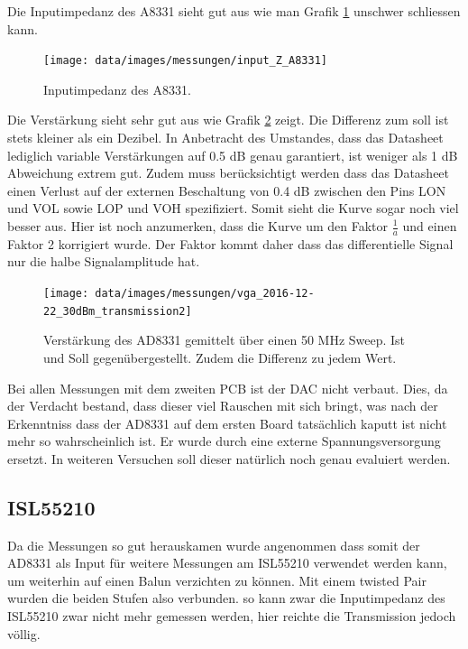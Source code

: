 Die Inputimpedanz des A8331 sieht gut aus wie man Grafik \ref{fig:Z_in_A8331} unschwer schliessen kann.

\begin{figure}[H]
\begin{center}
    \texttt{[image: data/images/messungen/input\_Z\_A8331]}
    \caption{Inputimpedanz des A8331.}
    \label{fig:Z_in_A8331}
\end{center}
\end{figure}

Die Verstärkung sieht sehr gut aus wie Grafik \ref{fig:T_A8331} zeigt. Die Differenz zum soll ist stets kleiner als ein Dezibel. In Anbetracht des Umstandes, dass das Datasheet lediglich variable Verstärkungen auf 0.5 dB genau garantiert, ist weniger als 1 dB Abweichung extrem gut. Zudem muss berücksichtigt werden dass das Datasheet einen Verlust auf der externen Beschaltung von 0.4 dB zwischen den Pins LON und VOL sowie LOP und VOH spezifiziert.
Somit sieht die Kurve sogar noch viel besser aus.
Hier ist noch anzumerken, dass die Kurve um den Faktor $\frac{1}{a}$ und einen Faktor 2 korrigiert wurde. Der Faktor kommt daher dass das differentielle Signal nur die halbe Signalamplitude hat. 

\begin{figure}[H]
\begin{center}
    \texttt{[image: data/images/messungen/vga\_2016-12-22\_30dBm\_transmission2]}
    \caption{Verstärkung des AD8331 gemittelt über einen 50 MHz Sweep. Ist und Soll gegenübergestellt. Zudem die Differenz zu jedem Wert.}
    \label{fig:T_A8331}
\end{center}
\end{figure}

Bei allen Messungen mit dem zweiten PCB ist der DAC nicht verbaut. Dies, da der Verdacht bestand, dass dieser viel Rauschen mit sich bringt, was nach der Erkenntniss dass der AD8331 auf dem ersten Board tatsächlich kaputt ist nicht mehr so wahrscheinlich ist. Er wurde durch eine externe Spannungsversorgung ersetzt. In weiteren Versuchen soll dieser natürlich noch genau evaluiert werden.

\subsection{ISL55210}

Da die Messungen so gut herauskamen wurde angenommen dass somit der AD8331 als Input für weitere Messungen am ISL55210 verwendet werden kann, um weiterhin auf einen Balun verzichten zu können. Mit einem twisted Pair wurden die beiden Stufen also verbunden. so kann zwar die Inputimpedanz des ISL55210 zwar nicht mehr gemessen werden, hier reichte die Transmission jedoch völlig.

